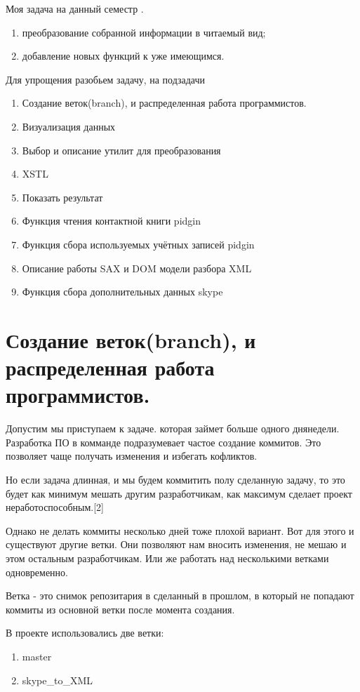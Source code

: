 \newpage
Моя задача на данный семестр . \\
\begin{enumerate}
\item преобразование собранной информации в читаемый вид;
\item добавление новых функций к уже имеющимся.
\end{enumerate}
Для упрощения разобьем задачу, на подзадачи
\begin{enumerate}
\item Создание веток(branch), и распределенная работа программистов. 
\item Визуализация данных
\item Выбор и описание утилит для преобразования
\item XSTL
\item Показать результат
\item Функция чтения контактной книги pidgin
\item Функция сбора используемых учётных записей pidgin
\item Описание работы SAX и DOM модели разбора XML
\item Функция сбора дополнительных данных skype
\end{enumerate}
\chapter*{Создание веток(branch), и распределенная работа программистов.}
Допустим мы приступаем к задаче. которая займет больше одного дня\/недели. Разработка ПО в комманде подразумевает частое создание коммитов. Это позволяет чаще получать изменения и избегать кофликтов. 

Но если задача длинная, и мы будем коммитить полу сделанную задачу, то это будет как минимум мешать другим разработчикам, как максимум сделает проект неработоспособным.[2]

Однако не делать коммиты несколько дней тоже плохой вариант. Вот для этого и существуют другие ветки. Они позволяют нам вносить изменения, не мешаю и этом остальным разработчикам. Или же работать над несколькими ветками одновременно.

Ветка - это снимок репозитария в сделанный в прошлом, в который не попадают коммиты из основной ветки после момента создания.

В проекте использовались две ветки:
\begin{enumerate}
\item master
\item skype_to_XML
\end{enumerate}

